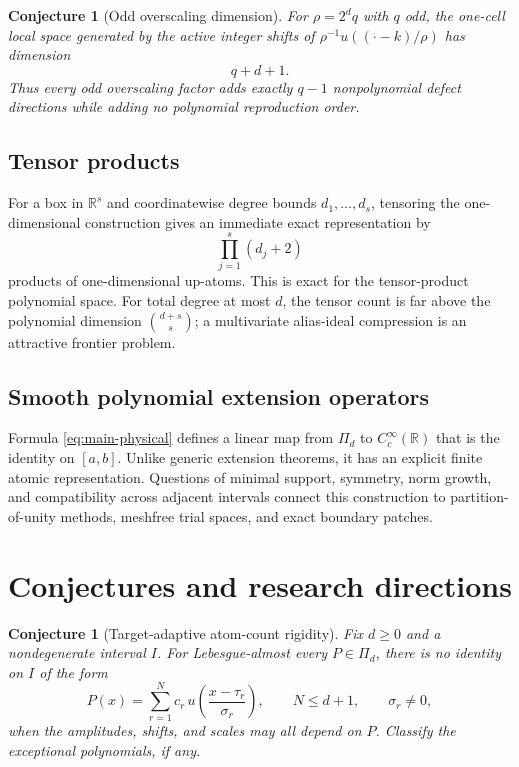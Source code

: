 \documentclass[11pt,oneside]{article}
\newtheorem{conjecture}[theorem]{Conjecture}
\theoremstyle{definition}
\theoremstyle{remark}
\newcommand{\R}{\mathbb R}
\begin{document}
\begin{conjecture}[Odd overscaling dimension]
\label{conj:odd-dim}
For $\rho=2^dq$ with $q$ odd, the one-cell local space generated by the active integer shifts of $\rho^{-1}u((\cdot-k)/\rho)$ has dimension
\begin{equation}
 q+d+1.                                                    \label{eq:odd-dim}
\end{equation}
Thus every odd overscaling factor adds exactly $q-1$ nonpolynomial defect directions while adding no polynomial reproduction order.
\end{conjecture}

\subsection{Tensor products}
For a box in $\R^s$ and coordinatewise degree bounds $d_1,\ldots,d_s$, tensoring the one-dimensional construction gives an immediate exact representation by
\begin{equation}
 \prod_{j=1}^{s}(d_j+2)                                   \label{eq:tensor-count}
\end{equation}
products of one-dimensional up-atoms.  This is exact for the tensor-product polynomial space.  For total degree at most $d$, the tensor count is far above the polynomial dimension $\binom{d+s}{s}$; a multivariate alias-ideal compression is an attractive frontier problem.

\subsection{Smooth polynomial extension operators}
Formula \eqref{eq:main-physical} defines a linear map from $\Pi_d$ to $C_c^\infty(\R)$ that is the identity on $[a,b]$.  Unlike generic extension theorems, it has an explicit finite atomic representation.  Questions of minimal support, symmetry, norm growth, and compatibility across adjacent intervals connect this construction to partition-of-unity methods, meshfree trial spaces, and exact boundary patches.

\section{Conjectures and research directions}

\begin{conjecture}[Target-adaptive atom-count rigidity]
\label{conj:global-minimality}
Fix $d\ge0$ and a nondegenerate interval $I$.  For Lebesgue-almost every $P\in\Pi_d$, there is no identity on $I$ of the form
\begin{equation}
 P(x)=\sum_{r=1}^{N}c_r\,
 u\!\left(\frac{x-\tau_r}{\sigma_r}\right),
 \qquad N\le d+1,
 \qquad \sigma_r\ne0,                                   \label{eq:adaptive-conjecture}
\end{equation}
when the amplitudes, shifts, and scales may all depend on $P$.  Classify the exceptional polynomials, if any.
\end{conjecture}
\end{document}
